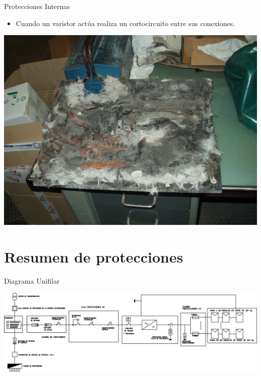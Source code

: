 \documentclass[xcolor={usenames,svgnames,dvipsnames}]{beamer}
\begin{document}
\begin{frame}[label={sec:org04d187f}]{Protecciones Internas}
\begin{itemize}
\item Cuando un varistor actúa realiza un cortocircuito entre sus
conexiones.
\end{itemize}

\begin{center}
\includegraphics[width=.9\linewidth]{../figs/CajaForumDestruida.pdf}
\end{center}
\end{frame}

\section{Resumen de protecciones}
\label{sec:org9adaba6}

\begin{frame}[plain,label={sec:orgbc29341}]{Diagrama Unifilar}
\begin{center}
\includegraphics[width=1.2\textwidth]{../figs/UnifilarCR1.pdf}
\end{center}
\end{frame}
\end{document}
